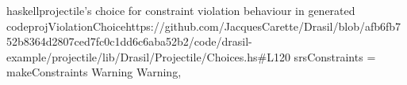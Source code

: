 \begin{codeSnippet}{haskell}{\acs{projectile}'s choice for constraint violation behaviour in generated code}{projViolationChoice}{https://github.com/JacquesCarette/Drasil/blob/afb6fb752b8364d2807ced7fc0c1dd6c6aba52b2/code/drasil-example/projectile/lib/Drasil/Projectile/Choices.hs\#L120}
    srsConstraints = makeConstraints Warning Warning,
\end{codeSnippet}
